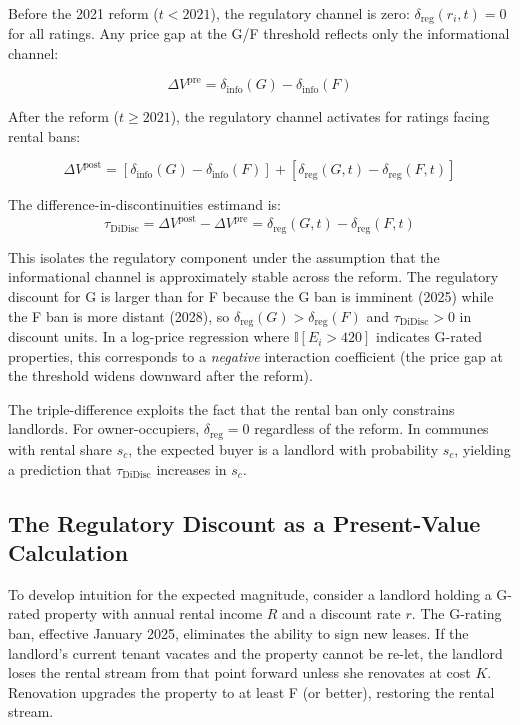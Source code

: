 \documentclass[12pt]{article}
\newcommand{\ind}{\mathbb{I}}
\begin{document}
Before the 2021 reform ($t < 2021$), the regulatory channel is zero: $\delta_{\text{reg}}(r_i, t) = 0$ for all ratings. Any price gap at the G/F threshold reflects only the informational channel:

\begin{equation}
\Delta V^{\text{pre}} = \delta_{\text{info}}(G) - \delta_{\text{info}}(F)
\end{equation}

After the reform ($t \geq 2021$), the regulatory channel activates for ratings facing rental bans:

\begin{equation}
\Delta V^{\text{post}} = [\delta_{\text{info}}(G) - \delta_{\text{info}}(F)] + [\delta_{\text{reg}}(G, t) - \delta_{\text{reg}}(F, t)]
\end{equation}

The difference-in-discontinuities estimand is:
\begin{equation}
\tau_{\text{DiDisc}} = \Delta V^{\text{post}} - \Delta V^{\text{pre}} = \delta_{\text{reg}}(G, t) - \delta_{\text{reg}}(F, t)
\end{equation}

This isolates the regulatory component under the assumption that the informational channel is approximately stable across the reform. The regulatory discount for G is larger than for F because the G ban is imminent (2025) while the F ban is more distant (2028), so $\delta_{\text{reg}}(G) > \delta_{\text{reg}}(F)$ and $\tau_{\text{DiDisc}} > 0$ in discount units. In a log-price regression where $\ind[E_i > 420]$ indicates G-rated properties, this corresponds to a \textit{negative} interaction coefficient (the price gap at the threshold widens downward after the reform).

The triple-difference exploits the fact that the rental ban only constrains landlords. For owner-occupiers, $\delta_{\text{reg}} = 0$ regardless of the reform. In communes with rental share $s_c$, the expected buyer is a landlord with probability $s_c$, yielding a prediction that $\tau_{\text{DiDisc}}$ increases in $s_c$.

\subsection{The Regulatory Discount as a Present-Value Calculation}

To develop intuition for the expected magnitude, consider a landlord holding a G-rated property with annual rental income $R$ and a discount rate $r$. The G-rating ban, effective January 2025, eliminates the ability to sign new leases. If the landlord's current tenant vacates and the property cannot be re-let, the landlord loses the rental stream from that point forward unless she renovates at cost $K$. Renovation upgrades the property to at least F (or better), restoring the rental stream.
\end{document}

